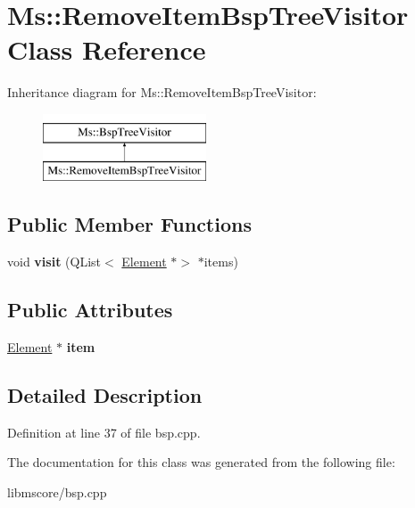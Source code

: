 \hypertarget{class_ms_1_1_remove_item_bsp_tree_visitor}{}\section{Ms\+:\+:Remove\+Item\+Bsp\+Tree\+Visitor Class Reference}
\label{class_ms_1_1_remove_item_bsp_tree_visitor}
Inheritance diagram for Ms\+:\+:Remove\+Item\+Bsp\+Tree\+Visitor\+:\begin{figure}[H]
\begin{center}
\leavevmode
\includegraphics[height=2.000000cm]{class_ms_1_1_remove_item_bsp_tree_visitor}
\end{center}
\end{figure}
\subsection*{Public Member Functions}
\begin{DoxyCompactItemize}
\item 
\mbox{\label{class_ms_1_1_remove_item_bsp_tree_visitor_a6c53dae14aae1b60ad35999fd8d64656}} 
void {\bfseries visit} (Q\+List$<$ \hyperlink{class_ms_1_1_element}{Element} $\ast$$>$ $\ast$items)
\end{DoxyCompactItemize}
\subsection*{Public Attributes}
\begin{DoxyCompactItemize}
\item 
\mbox{\label{class_ms_1_1_remove_item_bsp_tree_visitor_af7791921c768d4313f55e61b751dbf8e}} 
\hyperlink{class_ms_1_1_element}{Element} $\ast$ {\bfseries item}
\end{DoxyCompactItemize}


\subsection{Detailed Description}


Definition at line 37 of file bsp.\+cpp.



The documentation for this class was generated from the following file\+:\begin{DoxyCompactItemize}
\item 
libmscore/bsp.\+cpp\end{DoxyCompactItemize}

